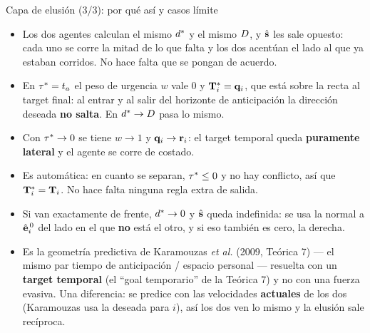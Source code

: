 \documentclass[aspectratio=169,11pt]{beamer}
\begin{document}
\begin{frame}{Capa de elusión (3/3): por qué así y casos límite}
    \vspace{-0.1em}
    \footnotesize
    \begin{itemize}\setlength{\itemsep}{0.55em}
        \item {} Los dos agentes calculan el mismo $d^{*}$ y
              el mismo $D$, y $\hat{\mathbf{s}}$ les sale opuesto: cada uno se corre
              la mitad de lo que falta y los dos acentúan el lado al que ya
              estaban corridos. No hace falta que se pongan de acuerdo.
        \item {} En
              $\tau^{*} = t_a$ el peso de urgencia $w$ vale 0 y
              $\mathbf{T}_i^{*} = \mathbf{q}_i$, que está sobre la recta al target final: al
              entrar y al salir del horizonte de anticipación la dirección
              deseada \textbf{no salta}. En $d^{*} \to D$ pasa lo mismo.
        \item {} Con $\tau^{*} \to 0$ se tiene
              $w \to 1$ y $\mathbf{q}_i \to \mathbf{r}_i$: el target temporal queda
              \textbf{puramente lateral} y el agente se corre de costado.
        \item {} Es automática: en cuanto se
              separan, $\tau^{*} \le 0$ y no hay conflicto, así que
              $\mathbf{T}_i^{*} = \mathbf{T}_i$. No hace falta ninguna regla extra de salida.
        \item {} Si van exactamente de frente, $d^{*} \to 0$ y
              $\hat{\mathbf{s}}$ queda indefinida: se usa la normal a $\hat{\mathbf{e}}_i^{\,0}$ del
              lado en el que \textbf{no} está el otro, y si eso también es cero,
              la derecha.
        \item {} Es la geometría predictiva de Karamouzas \emph{et
              al.} (2009, Teórica 7) --- el mismo par tiempo de anticipación /
              espacio personal --- resuelta con un \textbf{target temporal} (el
              ``goal temporario'' de la Teórica 7) y no con una fuerza evasiva.
              Una diferencia: se predice con las velocidades \textbf{actuales} de
              los dos (Karamouzas usa la deseada para $i$), así los dos ven lo
              mismo y la elusión sale recíproca.
    \end{itemize}
\end{frame}
\end{document}
